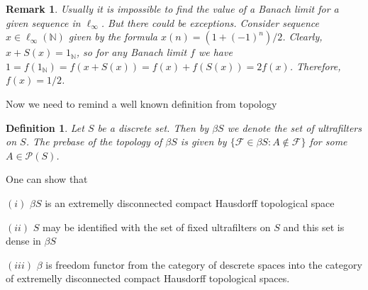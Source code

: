 \documentclass[12pt]{article}
\newtheorem{remark}[theorem]{Remark}
\newtheorem{definition}[theorem]{Definition}
\begin{document}
\begin{remark}\label{RemValueOfTheBanachLimit} Usually it is impossible to find
    the value of a Banach limit for a given sequence in $\ell_\infty$. But there
    could be exceptions. Consider sequence $x\in\ell_\infty(\mathbb{N})$ given
    by the formula $x(n)=(1+{(-1)}^n)/2$. Clearly, $x+S(x)=1_{\mathbb{N}}$, so
    for any Banach limit $f$ we have
    $1=f(1_{\mathbb{N}})=f(x+S(x))=f(x)+f(S(x))=2f(x)$. Therefore, $f(x)=1/2$.
\end{remark}

Now we need to remind a well known definition from topology

\begin{definition}\label{DefStoneCechCompactificationOfDiscerteSet} Let $S$ be a
    discrete set. Then by $\beta S$ we denote the set of ultrafilters on $S$.
    The prebase of the topology of $\beta S$ is given by $\{\mathcal{F}\in\beta
        S:A\notin\mathcal{F}\}$ for some $A\in\mathcal{P}(S)$.
\end{definition}

One can show that

$(i)$ $\beta S$ is an extremelly disconnected compact Hausdorff topological
space

$(ii)$ $S$ may be identified with the set of fixed ultrafilters on $S$ and this
set is dense in $\beta S$

$(iii)$ $\beta$ is freedom functor from the category of descrete spaces into the
category of extremelly disconnected compact Hausdorff topological spaces.
\end{document}
